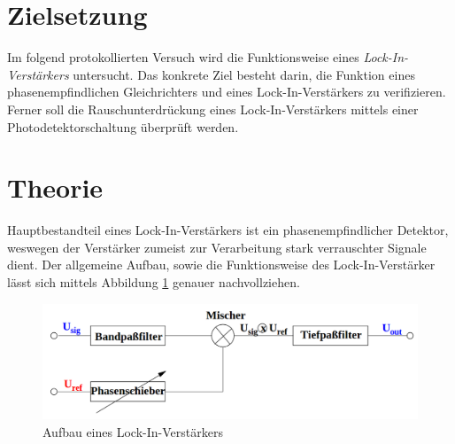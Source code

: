 %

%
\section{Zielsetzung}
\label{sec:Zielsetzung}

Im folgend protokollierten Versuch wird die Funktionsweise eines \emph{Lock-In-Verstärkers} untersucht.
Das konkrete Ziel besteht darin, die Funktion eines phasenempfindlichen Gleichrichters und eines Lock-In-Verstärkers
zu verifizieren. Ferner soll die Rauschunterdrückung eines Lock-In-Verstärkers mittels einer Photodetektorschaltung
überprüft werden.

\section{Theorie}
\label{sec:Theorie}

Hauptbestandteil eines Lock-In-Verstärkers ist ein phasenempfindlicher Detektor, weswegen der Verstärker zumeist zur 
Verarbeitung stark verrauschter Signale dient. Der allgemeine Aufbau, sowie die Funktionsweise des Lock-In-Verstärker lässt
sich mittels Abbildung \ref{fig:Versuchsaufbau} genauer nachvollziehen.

\begin{figure}[H]
    \centering
    \includegraphics[width=\textwidth]{./content/Versuchsaufbau.png}
    \caption{Aufbau eines Lock-In-Verstärkers}
    \label{fig:Versuchsaufbau}
\end{figure}

